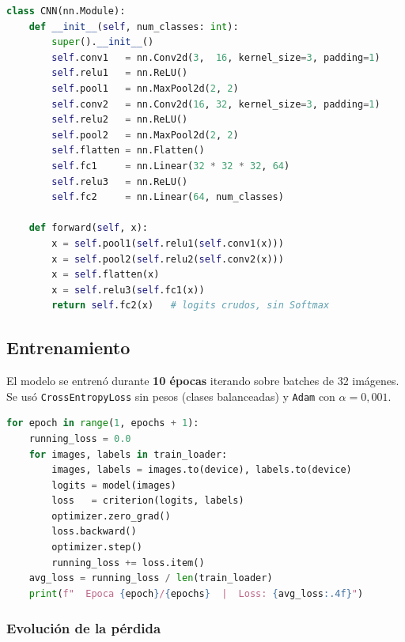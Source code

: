 \documentclass[12pt,a4paper]{article}
\begin{document}
\begin{lstlisting}[language=Python, caption={Definición de la CNN (\texttt{model.py})}]
class CNN(nn.Module):
    def __init__(self, num_classes: int):
        super().__init__()
        self.conv1   = nn.Conv2d(3,  16, kernel_size=3, padding=1)
        self.relu1   = nn.ReLU()
        self.pool1   = nn.MaxPool2d(2, 2)
        self.conv2   = nn.Conv2d(16, 32, kernel_size=3, padding=1)
        self.relu2   = nn.ReLU()
        self.pool2   = nn.MaxPool2d(2, 2)
        self.flatten = nn.Flatten()
        self.fc1     = nn.Linear(32 * 32 * 32, 64)
        self.relu3   = nn.ReLU()
        self.fc2     = nn.Linear(64, num_classes)

    def forward(self, x):
        x = self.pool1(self.relu1(self.conv1(x)))
        x = self.pool2(self.relu2(self.conv2(x)))
        x = self.flatten(x)
        x = self.relu3(self.fc1(x))
        return self.fc2(x)   # logits crudos, sin Softmax
\end{lstlisting}

\subsection{Entrenamiento}

El modelo se entrenó durante \textbf{10 épocas} iterando sobre batches de 32
imágenes. Se usó \texttt{CrossEntropyLoss} sin pesos (clases balanceadas) y
\texttt{Adam} con $\alpha = 0{,}001$.

\begin{lstlisting}[language=Python, caption={Bucle de entrenamiento por batches (\texttt{train.py})}]
for epoch in range(1, epochs + 1):
    running_loss = 0.0
    for images, labels in train_loader:
        images, labels = images.to(device), labels.to(device)
        logits = model(images)
        loss   = criterion(logits, labels)
        optimizer.zero_grad()
        loss.backward()
        optimizer.step()
        running_loss += loss.item()
    avg_loss = running_loss / len(train_loader)
    print(f"  Epoca {epoch}/{epochs}  |  Loss: {avg_loss:.4f}")
\end{lstlisting}

\subsubsection{Evolución de la pérdida}
\end{document}
